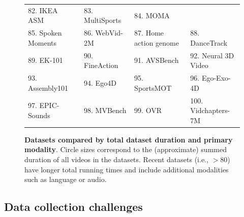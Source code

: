 \begin{figure}[t]
{\begin{tabular}{llll}
      82. IKEA ASM~\citep{ben2021ikea} &
      83. MultiSports~\citep{li2021multisports} &
      84. MOMA~\citep{luo2021moma} \\
      85. Spoken Moments~\citep{monfort2021spoken} &
      86. WebVid-2M~\citep{bain2021frozen} &
      87. Home action genome~\citep{rai2021home} & 
      88. DanceTrack~\citep{sun2022dancetrack} \\
      89. EK-101~\citep{damen2022rescaling} &
      90. FineAction~\citep{liu2022fineaction} &
      91. AVSBench~\citep{zhou2022audio} &
      92. Neural 3D Video~\citet{li2022neural} \\
      93. Assembly101~\citep{sener2022assembly101} &
      94. Ego4D \citep{grauman2022ego4d} &
      95. SportsMOT~\citep{cui2023sportsmot} &
      96. Ego-Exo-4D \citep{grauman2024ego} \\ 
      97. EPIC-Sounds \citep{huh2023epic} &
      98. MVBench \citep{li2024mvbench} &
      99. OVR \citep{dwibedi2024ovr} &
      100. Vidchapters-7M \citep{yang2024vidchapters}
    \end{tabular}
    }
    \caption{\textbf{Datasets compared by total dataset duration and primary modality}. Circle sizes correspond to the (approximate) summed duration of all videos in the datasets. Recent datasets (i.e., $>80$) have longer total running times and include additional modalities such as language or audio.}
    \label{fig:dataset_blobs}
\end{figure}

\subsection{Data collection challenges}
\label{sec:datasets::challenges}

